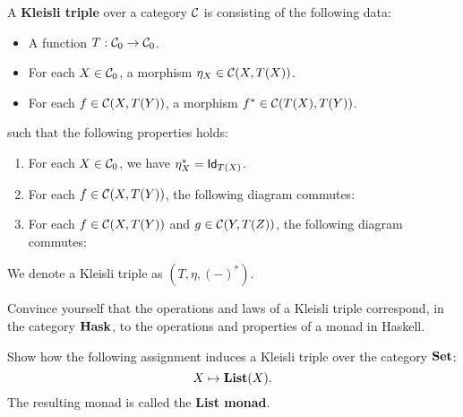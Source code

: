 \begin{dfn}\label{def:kleisli-triple}
  A \textbf{Kleisli triple} over a category $\CC$ is  consisting of the following data:
\begin{itemize}
\item A function $T: \Ob{\CC}\to \Ob{\CC}$.
\item For each $X\in\Ob{\CC}$, a morphism $\eta_X \in \CHom{\CC}{X}{T(X)}$.
\item For each $f\in\CHom{\CC}{X}{T(Y)}$, a morphism $f^{*} \in \CHom{\CC}{T(X)}{T(Y)}$.
\end{itemize}
such that the following properties holds:
\begin{enumerate}
\item For each $X \in \Ob\CC$, we have $\eta_X^{*} = \Id[T(X)]$.
\item For each $f\in\CHom{\CC}{X}{T(Y)}$, the following diagram commutes:
\begin{center}
\end{center}
\item For each $f\in\CHom{\CC}{X}{T(Y)}$ and $g\in\CHom{\CC}{Y}{T(Z)}$, the following diagram commutes:
\begin{center}
\end{center}
\end{enumerate}
We denote a Kleisli triple as $(T,\eta, (-)^{*})$.
\end{dfn}

\begin{exer}
  Convince yourself that the operations and laws of a Kleisli triple correspond, in the category $\HASK$, to the operations and properties of a monad in Haskell.
\end{exer}

\begin{exer}\label{exer:kleisli_triple_list} Show how the following assignment induces a Kleisli triple over the category $\SET$:
\[
X\mapsto \List(X).
\]
The resulting monad is called the \textbf{List monad}.
\end{exer}

